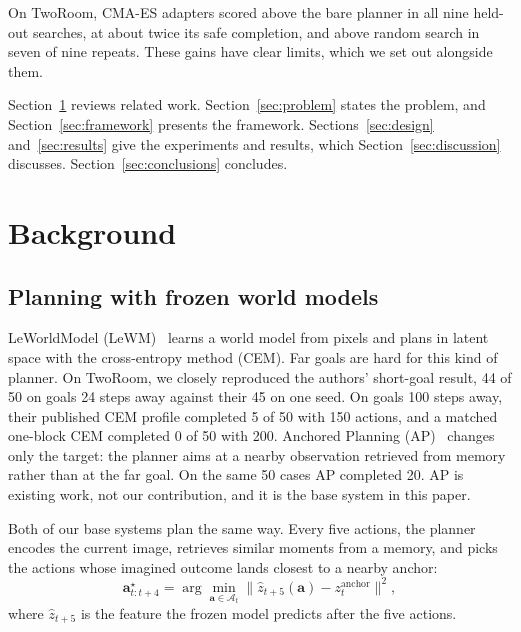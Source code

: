 \documentclass[dvipsnames,format=sigconf]{acmart}
\newcommand{\cmaes}{CMA-ES}
\begin{document}
On TwoRoom, \cmaes{} adapters scored above the bare planner in all nine held-out searches, at
about twice its safe completion, and above random search in seven of nine repeats. These gains
have clear limits, which we set out alongside them.

Section~\ref{sec:background} reviews related work. Section~\ref{sec:problem} states the problem,
and Section~\ref{sec:framework} presents the framework. Sections~\ref{sec:design}
and~\ref{sec:results} give the experiments and results, which Section~\ref{sec:discussion}
discusses. Section~\ref{sec:conclusions} concludes.

\section{Background}
\label{sec:background}

\subsection{Planning with frozen world models}

LeWorldModel (LeWM)~\cite{maes2026lewm} learns a world model from pixels and plans in latent
space with the cross-entropy method (CEM). Far goals are hard for this kind of planner. On
TwoRoom, we closely reproduced the authors' short-goal result, 44 of 50 on goals 24 steps away
against their 45 on one seed. On goals 100 steps away, their published CEM profile completed 5
of 50 with 150 actions, and a matched one-block CEM completed 0 of 50 with 200.
Anchored Planning (AP)~\cite{liu2026aim} changes only the target: the planner aims at a nearby
observation retrieved from memory rather than at the far goal. On the same 50 cases AP completed
20. AP is existing work, not our contribution, and it is the base system in this paper.

Both of our base systems plan the same way. Every five actions, the planner encodes the current
image, retrieves similar moments from a memory, and picks the actions whose imagined outcome
lands closest to a nearby anchor:
\begin{equation}
  \mathbf{a}^\star_{t:t+4} = \arg\min_{\mathbf{a}\in\mathcal{A}_t}
  \bigl\lVert \hat z_{t+5}(\mathbf{a}) - z^{\text{anchor}}_t \bigr\rVert^2 ,
  \label{eq:plan}
\end{equation}
where $\hat z_{t+5}$ is the feature the frozen model predicts after the five actions.
\end{document}
